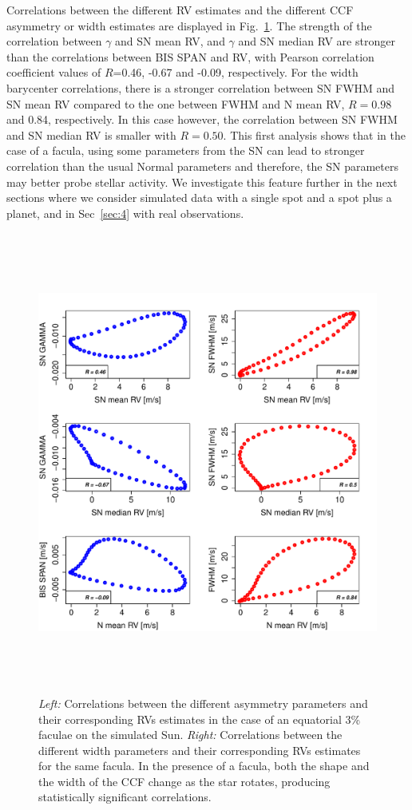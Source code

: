 \documentclass{aa}
\begin{document}
Correlations between the different RV estimates and the different CCF asymmetry or width estimates are displayed in Fig.~\ref{fig:faculae.corr}. The strength of the correlation between $\gamma$ and SN mean RV, and $\gamma$ and SN median RV are stronger than the correlations between BIS SPAN and RV, with Pearson correlation coefficient values of $R$=0.46, -0.67 and -0.09, respectively. For the width barycenter correlations, there is a stronger correlation between SN FWHM and SN mean RV compared to the one between FWHM and N mean RV, $R=0.98$ and 0.84, respectively. In this case however, the correlation between SN FWHM and SN median RV is smaller with $R=0.50$. This first analysis shows that in the case of a facula, using some parameters from the SN can lead to stronger correlation than the usual Normal parameters and therefore, the SN parameters may better probe stellar activity. We investigate this feature further in the next sections where we consider simulated data with a single spot and a spot plus a planet, and in Sec~\ref{sec:4} with real observations.

\begin{figure}[htbp]
\begin{center}
\includegraphics[height = 6in]{SOAP_FACULAE_Comparison_para_SN.pdf} 
   \caption{\emph{Left:} Correlations between the different asymmetry parameters and their corresponding RVs estimates in the case of an equatorial 3\% faculae on the simulated Sun. \emph{Right:} Correlations between the different width parameters and their corresponding RVs estimates for the same facula.
   In the presence of a facula, both the shape and the width of the CCF change as the star rotates, producing statistically significant correlations.}
    \label{fig:faculae.corr}
\end{center}
\end{figure}
\end{document}
